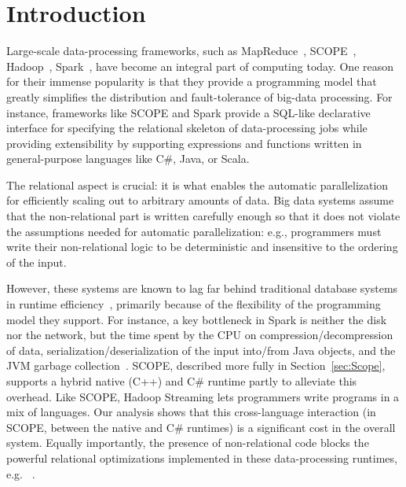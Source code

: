 \section{Introduction \label{sec:intro}}
Large-scale data-processing frameworks, such as MapReduce~\cite{Dean:2008:MSD:1327452.1327492}, SCOPE~\cite{SCOPE}, Hadoop~\cite{Dittrich:2010}, Spark~\cite{zaharia2010spark}, have become an integral part of computing today. One reason for their immense popularity is that they provide a programming model that greatly simplifies the distribution and fault-tolerance of big-data processing. For instance, frameworks like SCOPE and Spark provide a SQL-like declarative interface for specifying the relational skeleton of data-processing jobs while providing extensibility by supporting expressions and functions written in general-purpose languages like C\#, Java, or Scala. 

The relational aspect is crucial: it is what enables the automatic parallelization for efficiently scaling out to arbitrary amounts of data.
Big data systems assume that the non-relational part is written carefully enough so that it does not violate the assumptions needed for automatic parallelization: e.g., programmers must write their non-relational logic to be deterministic and insensitive to the ordering of the input.

However, these systems are known to lag far behind traditional database systems in runtime efficiency~\cite{Jahani:2011,Pavlo:2009}, primarily because of the flexibility of the programming model they support. For instance,  a key bottleneck in Spark is neither the disk nor the network, but the time spent by the CPU on compression/decompression of data, serialization/deserialization of the input into/from Java objects, and the JVM garbage collection~\cite{ousterhout-nsdi15}. SCOPE,  described more fully in Section~\ref{sec:Scope}, supports a hybrid native (C++) and C\# runtime partly to alleviate this overhead.
Like SCOPE, Hadoop Streaming lets programmers write programs in a mix of languages\cite{hadoop_stream}. 
Our analysis shows that this cross-language interaction (in SCOPE, between the native and C\# runtimes) is a significant cost in the overall system.  
Equally importantly, the presence of non-relational code blocks the powerful relational optimizations implemented in these data-processing runtimes, e.g. ~\cite{guo2012spotting}. 


